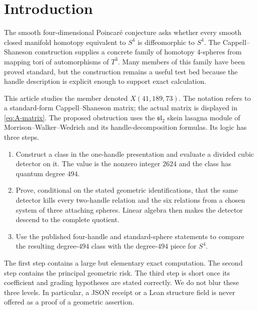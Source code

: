 \documentclass[10pt,reqno]{amsart}
\theoremstyle{definition}
\theoremstyle{remark}
\begin{document}
\maketitle
\tableofcontents

\section{Introduction}

The smooth four-dimensional Poincar\'e conjecture asks whether every smooth
closed manifold homotopy equivalent to $S^4$ is diffeomorphic to $S^4$.  The
Cappell--Shaneson construction supplies a concrete family of homotopy
$4$-spheres from mapping tori of automorphisms of $T^3$.  Many members of this
family have been proved standard, but the construction remains a useful test
bed because the handle description is explicit enough to support exact
calculation.

This article studies the member denoted $X(41,189,73)$.  The notation refers
to a standard-form Cappell--Shaneson matrix; the actual matrix is displayed in
\cref{eq:A-matrix}.  The proposed obstruction uses the
$\mathfrak{sl}_2$ skein lasagna module of Morrison--Walker--Wedrich and its
handle-decomposition formulas.  Its logic has three steps.

\begin{enumerate}
\item Construct a class in the one-handle presentation and evaluate a divided
  cubic detector on it.  The value is the nonzero integer $2624$ and the
  class has quantum degree $494$.
\item Prove, conditional on the stated geometric identifications, that the
  same detector kills every two-handle relation and the six relations from a
  chosen system of three attaching spheres.  Linear algebra then makes the
  detector descend to the complete quotient.
\item Use the published four-handle and standard-sphere statements to compare
  the resulting degree-$494$ class with the degree-$494$ piece for $S^4$.
\end{enumerate}

The first step contains a large but elementary exact computation.  The second
step contains the principal geometric risk.  The third step is short once its
coefficient and grading hypotheses are stated correctly.  We do not blur
these three levels.  In particular, a JSON receipt or a Lean structure field
is never offered as a proof of a geometric assertion.
\end{document}
